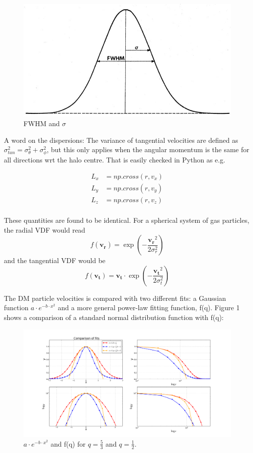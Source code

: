 \begin{figure}
\centering
\includegraphics[width=1.0 cm]{img/figure4.jpeg}
\caption{FWHM and $\sigma$ }
\label{fig:test}
\end{figure}

A word on the dispersions: The variance of tangential velocities are defined as $\sigma_{tan}^2 = \sigma_{\theta}^2 + \sigma_{\phi}^2 $,
but this only applies when the angular momentum is the same for all directions wrt the halo centre.
That is easily checked in Python as e.g.

\begin{equation}
\begin{aligned}
L_x &= np.cross(r, v_x) \\
L_y &= np.cross(r, v_y) \\ 
L_z &= np.cross(r, v_z) \\
\end{aligned}
\end{equation}

These quantities are found to be identical.
For a spherical system of gas particles, the radial VDF would read
\begin{equation}
f(\boldsymbol{v_r}) = \exp (-\frac{\boldsymbol{v_r}^2}{2\sigma_r^2})
\end{equation}
and the tangential VDF would be
\begin{equation}
f(\boldsymbol{v_t}) = \boldsymbol{v_t} \cdot \exp (-\frac{\boldsymbol{v_t}^2}{2\sigma_t^2})
\end{equation}

The DM particle velocities is compared with two different fits: a Gaussian function $ a\cdot e^{-b\cdot x^2} $ and a more general power-law fitting function, f(q).
Figure 1 shows a comparison of a standard normal distribution function with f(q):

\begin{figure}
\centering
\includegraphics[width=1.0\linewidth]{img/fitcomparison.png}
\caption{$ a\cdot e^{-b\cdot x^2} $ and f(q) for $ q = \frac{5}{3}$ and $ q = \frac{1}{2}$.}
\label{fig:test}
\end{figure}

